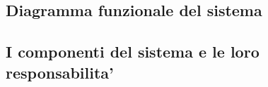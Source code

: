 \subsection{Diagramma funzionale del sistema}
\label{subsec:diagramma}
%
%
%
%
%

\subsection{I componenti del sistema e le loro responsabilita'}
\label{subsec:componenti}
%
%
%
%


